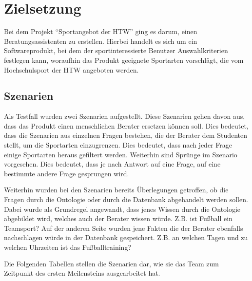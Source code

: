 \chapter{Zielsetzung}

Bei dem Projekt "`Sportangebot der HTW"' ging es darum, einen Beratungsassistenten zu erstellen. Hierbei handelt es sich um ein Softwareprodukt, bei dem der sportinteressierte Benutzer Auswahlkriterien festlegen kann, woraufhin das Produkt geeignete Sportarten vorschlägt, die vom Hochschulsport der HTW angeboten werden.

\section{Szenarien}

Als Testfall wurden zwei Szenarien aufgestellt. Diese Szenarien gehen davon aus, dass das Produkt einen menschlichen Berater ersetzen können soll. Dies bedeutet, dass die Szenarien aus einzelnen Fragen bestehen, die der Berater dem Studenten stellt, um die Sportarten einzugrenzen. Dies bedeutet, dass nach jeder Frage einige Sportarten heraus gefiltert werden. Weiterhin sind Sprünge im Szenario vorgesehen. Dies bedeutet, dass je nach Antwort auf eine Frage, auf eine bestimmte andere Frage gesprungen wird.

Weiterhin wurden bei den Szenarien bereits Überlegungen getroffen, ob die Fragen durch die Ontologie oder durch die Datenbank abgehandelt werden sollen. Dabei wurde als Grundregel angewandt, dass jenes Wissen durch die Ontologie abgebildet wird, welches auch der Berater wissen würde. Z.B. ist Fußball ein Teamsport? Auf der anderen Seite wurden jene Fakten die der Berater ebenfalls nachschlagen würde in der Datenbank gespeichert. Z.B. an welchen Tagen und zu welchen Uhrzeiten ist das Fußballtraining?

Die Folgenden Tabellen stellen die Szenarien dar, wie sie das Team zum Zeitpunkt des ersten Meilensteins ausgearbeitet hat.



